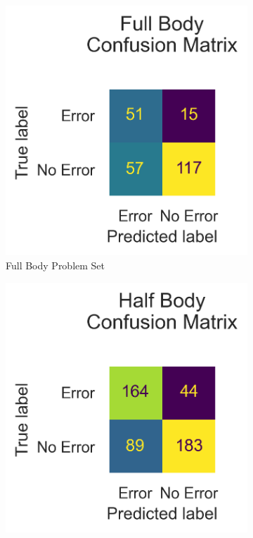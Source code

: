 \begin{figure}[htbp]
  \centering
  \begin{subfigure}[b]{0.35\linewidth}
      \centering
      \includegraphics[width=\textwidth]{figures/results_hi/v2/confusion/full_together.png}
      \caption[]{Full Body Problem Set}
      \label{fig:hi_fb_conf}
  \end{subfigure}
  \hfill
  \begin{subfigure}[b]{0.35\linewidth}
      \centering
      \includegraphics[width=\textwidth]{figures/results_hi/v2/confusion/half_together.png}

\end{subfigure}
\end{figure}
